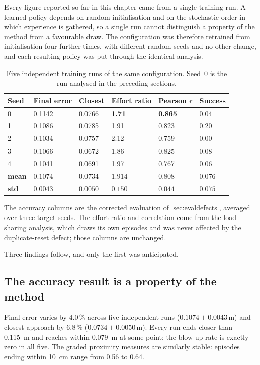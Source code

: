 Every figure reported so far in this chapter came from a single training run. A
learned policy depends on random initialisation and on the stochastic order in
which experience is gathered, so a single run cannot distinguish a property of
the method from a favourable draw. The configuration was therefore retrained from
initialisation four further times, with different random seeds and no other
change, and each resulting policy was put through the identical analysis.

\begin{table}[H]
\centering
\caption{Five independent training runs of the same configuration. Seed~0 is the
run analysed in the preceding sections.}
\small
\begin{tabular}{@{} C{1.8cm} C{2.4cm} C{2.4cm} C{2.2cm} C{2.0cm} C{2.0cm} @{}}
\toprule
\textbf{Seed} & \textbf{Final error} & \textbf{Closest} & \textbf{Effort ratio} & \textbf{Pearson $r$} & \textbf{Success} \\
 & 0.1142 & 0.0766 & \textbf{1.71} & \textbf{0.865} & 0.04 \\
1 & 0.1086 & 0.0785 & 1.91 & 0.823 & 0.20 \\
2 & 0.1034 & 0.0757 & 2.12 & 0.759 & 0.00 \\
3 & 0.1066 & 0.0672 & 1.86 & 0.825 & 0.08 \\
4 & 0.1041 & 0.0691 & 1.97 & 0.767 & 0.06 \\
\midrule
\textbf{mean} & $0.1074$ & $0.0734$ & $1.914$ & $0.808$ & $0.076$ \\
\textbf{std}  & $0.0043$ & $0.0050$ & $0.150$ & $0.044$ & $0.075$ \\
\bottomrule
\end{tabular}
\label{tab:replication}
\end{table}

The accuracy columns are the corrected evaluation of \cref{sec:evaldefects},
averaged over three target seeds. The effort ratio and correlation come from the
load-sharing analysis, which draws its own episodes and was never affected by the
duplicate-reset defect; those columns are unchanged.

Three findings follow, and only the first was anticipated.

\subsection{The accuracy result is a property of the method}

Final error varies by 4.0\,\% across five independent runs
($0.1074 \pm 0.0043$\,m) and closest approach by 6.8\,\%
($0.0734 \pm 0.0050$\,m). Every run ends closer than \SI{0.115}{\meter} and
reaches within \SI{0.079}{\meter} at some point; the blow-up rate is exactly zero
in all five. The graded proximity measures are similarly stable: episodes ending
within \SI{10}{\centi\meter} range from 0.56 to 0.64.

